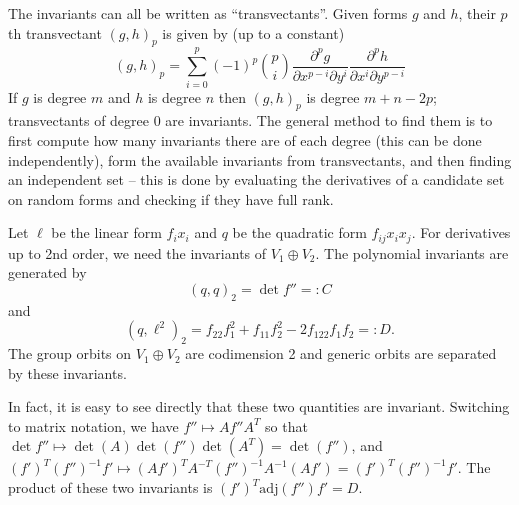 \documentclass{article}
\begin{document}
The invariants can all be written as ``transvectants''. 
Given forms $g$ and $h$, their $p$th transvectant $(g,h)_p$ is given by (up to a constant)
$$ (g,h)_p = \sum_{i=0}^p (-1)^p {p \choose i} 
\frac{\partial^p g}{\partial x^{p-i}\partial y^{i}}
\frac{\partial^p h}{\partial x^{i}\partial y^{p-i}}
$$
If $g$ is degree $m$ and $h$ is degree $n$ then $(g,h)_p$ is degree $m+n-2p$; transvectants of degree 0 are invariants.
The general method to find them is to first compute how many invariants there are of each degree (this can be done independently), form the available invariants from transvectants, and then finding an independent set -- this is done by evaluating the derivatives of a candidate set on random forms and checking if they have full rank.  

Let $\ell$ be the linear form $f_i x_i$ and $q$ be the quadratic form $f_{ij} x_i x_j$.
For derivatives up to 2nd order, we need the invariants of $V_1\oplus V_2$. 
The polynomial invariants are generated by
$$(q,q)_2 = \det f'' =: C$$
and
$$(q,\ell^2)_2 = f_{22}f_1^2 + f_{11}f_2^2 - 2 f_{122} f_1 f_2 =: D.$$
The group orbits on $V_1\oplus V_2$ are codimension 2 and generic orbits are separated by these invariants.

In fact, it is easy to see directly that these two quantities are invariant. Switching to matrix notation, we 
have $f'' \mapsto A f'' A^T$ so that $\det f'' \mapsto \det(A)\det(f'')\det(A^T) = \det(f'')$,
and $(f')^T (f'')^{-1} f' \mapsto (A f')^T A^{-T} (f'')^{-1} A^{-1}  (A f') = (f')^T (f'')^{-1} f'$. 
The product of these two invariants is $(f')^T \mathrm{adj}(f'') f' = D$.
\end{document}
